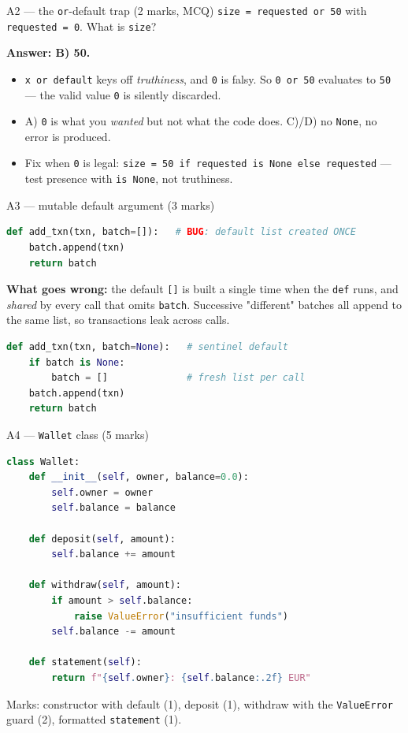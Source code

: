 \documentclass[aspectratio=169,11pt]{beamer}
\begin{document}
\begin{frame}[fragile]{A2 --- the \texttt{or}-default trap \hfill (2 marks, MCQ)}
\texttt{size = requested or 50} with \texttt{requested = 0}. What is \texttt{size}?
\medskip

\textbf{Answer: B) \textcolor{cgreen}{50}.}
\begin{itemize}
  \item \texttt{x or default} keys off \emph{truthiness}, and \texttt{0} is \textcolor{cred}{falsy}. So \texttt{0 or 50} evaluates to \texttt{50} --- the valid value \texttt{0} is silently discarded.
  \item A) \texttt{0} is what you \emph{wanted} but not what the code does. C)/D) no \texttt{None}, no error is produced.
  \item Fix when \texttt{0} is legal: \texttt{size = 50 if requested is None else requested} --- test presence with \texttt{is None}, not truthiness.
\end{itemize}
\end{frame}

\begin{frame}[fragile]{A3 --- mutable default argument \hfill (3 marks)}
\begin{lstlisting}[language=Python]
def add_txn(txn, batch=[]):   # BUG: default list created ONCE
    batch.append(txn)
    return batch
\end{lstlisting}
\textbf{What goes wrong:} the default \texttt{[]} is built a single time when the \texttt{def} runs, and \emph{shared} by every call that omits \texttt{batch}. Successive "different" batches all append to the same list, so transactions leak across calls.
\begin{lstlisting}[language=Python]
def add_txn(txn, batch=None):   # sentinel default
    if batch is None:
        batch = []              # fresh list per call
    batch.append(txn)
    return batch
\end{lstlisting}
\end{frame}

\begin{frame}[fragile]{A4 --- \texttt{Wallet} class \hfill (5 marks)}
\begin{lstlisting}[language=Python]
class Wallet:
    def __init__(self, owner, balance=0.0):
        self.owner = owner
        self.balance = balance

    def deposit(self, amount):
        self.balance += amount

    def withdraw(self, amount):
        if amount > self.balance:
            raise ValueError("insufficient funds")
        self.balance -= amount

    def statement(self):
        return f"{self.owner}: {self.balance:.2f} EUR"
\end{lstlisting}
\footnotesize Marks: constructor with default (1), deposit (1), withdraw with the \texttt{ValueError} guard (2), formatted \texttt{statement} (1).
\end{frame}
\end{document}
